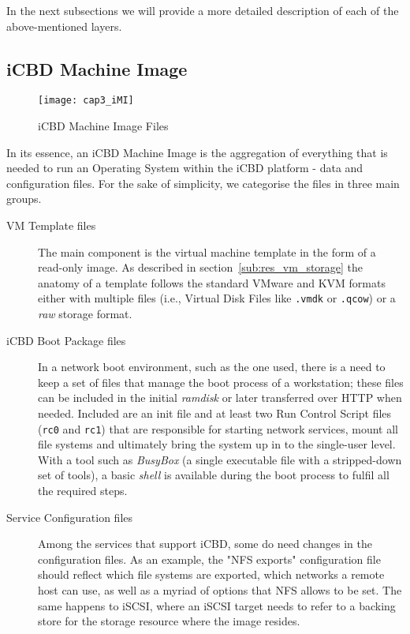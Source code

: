 \begin{description}
\end{description}
 
In the next subsections we will provide a more detailed description of each of the above-mentioned layers.

\subsection{iCBD Machine Image}
\label{sub:icbd_imi}

\begin{figure}[htbp]
	\centering
	\texttt{[image: cap3\_iMI]}
	\caption{iCBD Machine Image Files}
	\label{fig:icbd_iMI_files}
\end{figure}

In its essence, an iCBD Machine Image is the aggregation of everything that is needed to run an Operating System within the iCBD platform - data and configuration files. For the sake of simplicity, we categorise the files in three main groups.

\begin{description}
	\item [VM Template files] The main component is the virtual machine template in the form of a read-only image. As described in section~\ref{sub:res_vm_storage} the anatomy of a template follows the standard VMware and KVM formats either with multiple files (i.e., Virtual Disk Files like \texttt{.vmdk} or \texttt{.qcow}) or a \textit{raw} storage format.
	\item [iCBD Boot Package files] In a network boot environment, such as the one used, there is a need to keep a set of files that manage the boot process of a workstation; these files can be included in the initial \textit{ramdisk} or later transferred over HTTP when needed. Included are an init file and at least two Run Control Script files (\texttt{rc0} and \texttt{rc1}) that are responsible for starting network services, mount all file systems and ultimately bring the system up in to the single-user level. With a tool such as \textit{BusyBox} (a single executable file with a stripped-down set of tools), a basic \textit{shell} is available during the boot process to fulfil all the required steps.
	\item [Service Configuration files] Among the services that support iCBD, some do need changes in the configuration files. As an example, the "NFS exports" configuration file should reflect which file systems are exported, which networks a remote host can use, as well as a myriad of options that NFS allows to be set. The same happens to iSCSI, where an iSCSI target needs to refer to a backing store for the storage resource where the image resides. 
\end{description}

